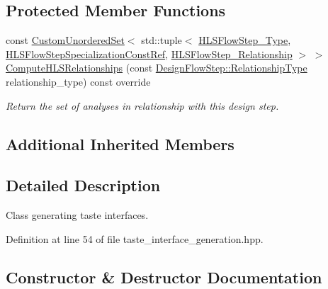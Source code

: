 \subsection*{Protected Member Functions}
\begin{DoxyCompactItemize}
\item 
const \hyperlink{classCustomUnorderedSet}{Custom\+Unordered\+Set}$<$ std\+::tuple$<$ \hyperlink{hls__step_8hpp_ada16bc22905016180e26fc7e39537f8d}{H\+L\+S\+Flow\+Step\+\_\+\+Type}, \hyperlink{hls__step_8hpp_a5fdd2edf290c196531d21d68e13f0e74}{H\+L\+S\+Flow\+Step\+Specialization\+Const\+Ref}, \hyperlink{hls__step_8hpp_a3ad360b9b11e6bf0683d5562a0ceb169}{H\+L\+S\+Flow\+Step\+\_\+\+Relationship} $>$ $>$ \hyperlink{classTasteInterfaceGeneration_ac81f5d05e67e11e91d4a03e6437a9fc0}{Compute\+H\+L\+S\+Relationships} (const \hyperlink{classDesignFlowStep_a723a3baf19ff2ceb77bc13e099d0b1b7}{Design\+Flow\+Step\+::\+Relationship\+Type} relationship\+\_\+type) const override
\begin{DoxyCompactList}\small\item\em Return the set of analyses in relationship with this design step. \end{DoxyCompactList}\end{DoxyCompactItemize}
\subsection*{Additional Inherited Members}


\subsection{Detailed Description}
Class generating taste interfaces. 

Definition at line 54 of file taste\+\_\+interface\+\_\+generation.\+hpp.



\subsection{Constructor \& Destructor Documentation}
\mbox{\label{classTasteInterfaceGeneration_a0da843c90610920daf5855c8f2fba111}} 
